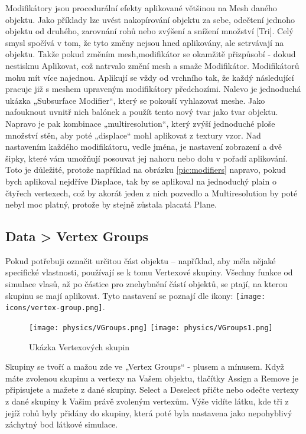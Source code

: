 \documentclass[12pt,a4paper]{report}
\begin{document}
	Modifikátory jsou procedurální efekty aplikované většinou na Mesh
	daného objektu. Jako příklady lze uvést nakopírování objektu za sebe,
	odečtení jednoho objektu od druhého, zarovnání rohů nebo zvýšení
	a snížení množství [Tri]. Celý smysl spočívá v tom, že tyto změny nejsou
	hned aplikovány, ale setrvávají na objektu. Takže pokud změním mesh,modifikátor se okamžitě přizpůsobí - dokud nestisknu Aplikovat, což
	natrvalo změní mesh a smaže Modifikátor. Modifikátorů mohu mít více
	najednou. Aplikují se vždy od vrchního tak, že každý následující pracuje
	již s meshem upraveným modifikátory předchozími.
	Nalevo je jednoduchá ukázka „Subsurface Modifier“, který se pokouší
	vyhlazovat meshe. Jako nafouknout uvnitř nich balónek a použít tento
	nový tvar jako tvar objektu. Napravo je pak kombinace „multiresolution“,
	který zvýší jednoduché ploše množství stěn, aby poté „displace“ mohl
	aplikovat z textury vzor.
	Nad nastavením každého modifikátoru, vedle jména, je nastavení
	zobrazení a dvě šipky, které vám umožňují posouvat jej nahoru nebo dolu
	v pořadí aplikování. Toto je důležité, protože například na obrázku \ref{pic:modifiers}
	napravo, pokud bych aplikoval nejdříve Displace, tak by se aplikoval na
	jednoduchý plain o čtyřech vertexech, což by akorát jeden z nich pozvedlo
	a Multiresolution by poté nebyl moc platný, protože by stejně zůstala
	placatá Plane.
	
	\subsection{Data > Vertex Groups}
	Pokud potřebuji označit určitou část objektu – například, aby měla nějaké
	specifické vlastnosti, používají se k tomu Vertexové skupiny. Všechny
	funkce od simulace vlasů, až po částice pro znehybnění částí objektů, se
	ptají, na kterou skupinu se mají aplikovat. Tyto nastavení se poznají dle
ikony:
\texttt{[image: icons/vertex-group.png]}.
	
	\begin{figure}[h]
		\centering
		\texttt{[image: physics/VGroups.png]}
		\texttt{[image: physics/VGroups1.png]}
		\caption{Ukázka Vertexových skupin}
		\label{pic:vertex-groups}
	\end{figure}
	
	Skupiny se tvoří a mažou zde ve „Vertex Groups“ - plusem a mínusem.
	Když máte zvolenou skupinu a vertexy na Vašem objektu, tlačítky Assign
	a Remove je připisujete a mažete z dané skupiny. Select a Deselect přičte
	nebo odečte vertexy z dané skupiny k Vašim právě zvoleným vertexům.
	Výše vidíte látku, kde tři z jejíž rohů byly přidány do skupiny, která poté
	byla nastavena jako nepohyblivý záchytný bod látkové simulace.
	
\end{document}
